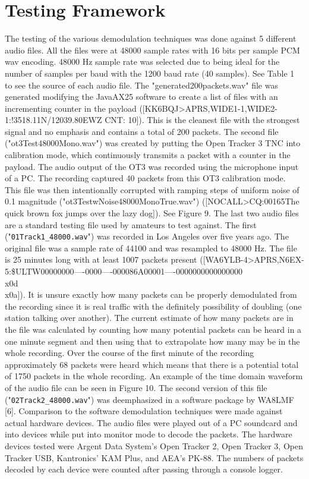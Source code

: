 \chapter{Testing Framework}

The testing of the various demodulation techniques was done against 5 different audio files. All the files were at 48000 sample rates with 16 bits per sample PCM wav encoding. 48000 Hz sample rate was selected due to being ideal for the number of samples per baud with the 1200 baud rate (40 samples). See Table 1 to see the source of each audio file. The "generated200packets.wav" file was generated modifying the JavaAX25 software to create a list of files with an incrementing counter in the payload ([KK6BQJ>APRS,WIDE1-1,WIDE2-1:!3518.11N/12039.80EWZ CNT: 10]). This is the cleanest file with the strongest signal and no emphasis and contains a total of 200 packets. The second file ("ot3Test48000Mono.wav") was created by putting the Open Tracker 3 TNC into calibration mode, which continuously transmits a packet with a counter in the payload. The audio output of the OT3 was recorded using the microphone input of a PC. The recording captured 40 packets from this OT3 calibration mode. This file was then intentionally corrupted with ramping steps of uniform noise of 0.1 magnitude ("ot3TestwNoise48000MonoTrue.wav") ([NOCALL>CQ:00165The quick brown fox jumps over the lazy dog]). See Figure 9.  The last two audio files are a standard testing file used by amateurs to test against. The first ("\verb|01Track1_48000.wav|") was recorded in Los Angeles over five years ago. The original file was a sample rate of 44100 and was resampled to 48000 Hz. The file is 25 minutes long with at least 1007 packets present ([WA6YLB-4>APRS,N6EX-5:\$ULTW00000000----0000----000086A00001----0000000000000000\\x0d\\x0a]). It is unsure exactly how many packets can be properly demodulated from the recording since it is real traffic with the definitely possibility of doubling (one station talking over another). The current estimate of how many packets are in the file was calculated by counting how many potential packets can be heard in a one minute segment and then using that to extrapolate how many may be in the whole recording. Over the course of the first minute of the recording approximately 68 packets were heard which means that there is a potential total of 1750 packets in the whole recording. An example of the time domain waveform of the audio file can be seen in Figure 10. The second version of this file ("\verb|02Track2_48000.wav|") was deemphasized in a software package by WA8LMF [6]. Comparison to the software demodulation techniques were made against actual hardware devices. The audio files were played out of a PC soundcard and into devices while put into monitor mode to decode the packets. The hardware devices tested were Argent Data System's Open Tracker 2, Open Tracker 3, Open Tracker USB, Kantronics' KAM Plus, and AEA's PK-88. The numbers of packets decoded by each device were counted after passing through a console logger.
